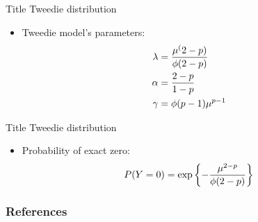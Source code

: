 \documentclass[12pt,t]{beamer}
\newcommand{\subt}[1]{{\footnotesize \color{subtitle} {#1}}}
\begin{document}
\begin{frame}{Title}
\subt{Tweedie distribution}
\bigskip

\begin{itemize}
  \item Tweedie model's parameters:
    \begin{align}
        \lambda &= \frac{\mu^(2-p)}{\phi (2-p)} \notag \\
        \alpha &= \frac{2-p}{1-p} \notag \\
        \gamma &= \phi(p-1)\mu^{p-1} \notag
    \end{align}
\end{itemize}

\end{frame}





\begin{frame}{Title}
\subt{Tweedie distribution}
\bigskip

\begin{itemize}
  \item Probability of exact zero:
    \begin{align}
        P(Y=0) = \exp \left\{ -\frac{\mu^{2-p}}{\phi (2-p)} \right\} \notag
    \end{align}
\end{itemize}

\end{frame}






%
%
%
%





\begin{frame}[allowframebreaks]
\frametitle{References}


\end{frame}
\end{document}
